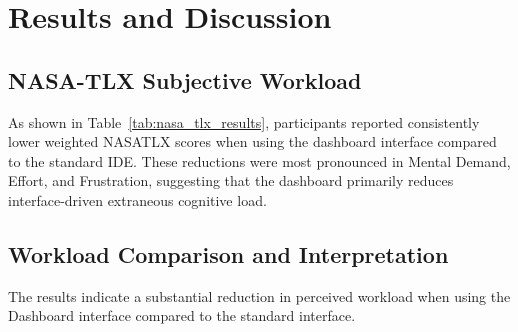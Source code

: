 \section{Results and Discussion}

\subsection{NASA-TLX Subjective Workload}
As shown in Table~\ref{tab:nasa_tlx_results}, participants reported consistently lower weighted \gls{NASATLX} scores when using the dashboard interface compared to the standard \gls{IDE}.
These reductions were most pronounced in Mental Demand, Effort, and Frustration, suggesting that the dashboard primarily reduces interface-driven 
extraneous cognitive load.
\begin{table}[H]
\centering
\caption{NASA-TLX Results for Standard vs Dashboard Interfaces}
\label{tab:nasa_tlx_results}
\end{table}


\subsection{Workload Comparison and Interpretation}
The results indicate a substantial reduction in perceived workload when using the Dashboard interface compared to the standard interface.


